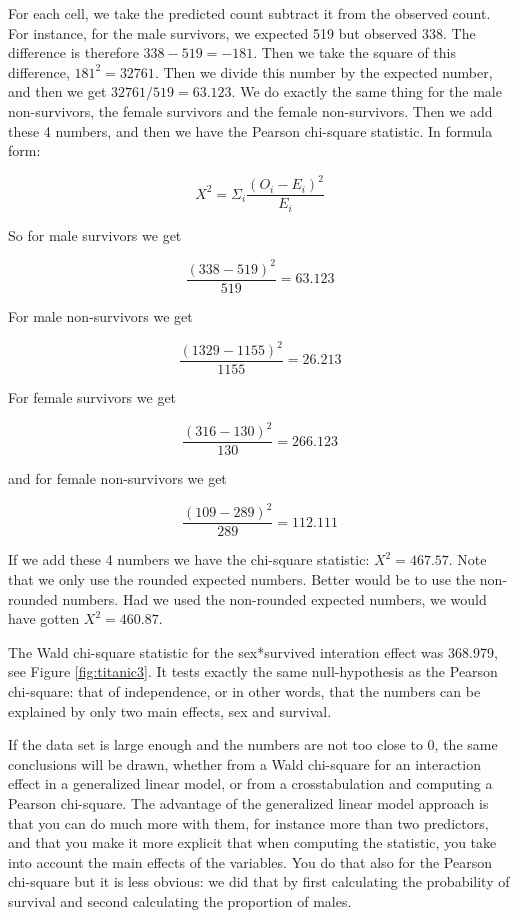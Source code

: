\documentclass[]{report}\usepackage[]{graphicx}\usepackage[]{color}
\begin{document}
For each cell, we take the predicted count subtract it from the observed count. For instance, for the male survivors, we expected 519 but observed 338. The difference is therefore $338-519= -181$. Then we take the square of this difference, $ 181^2=32761$. Then we divide this number by the expected number, and then we get $32761/519=63.123$. We do exactly the same thing for the male non-survivors, the female survivors and the female non-survivors. Then we add these 4 numbers, and then we have the Pearson chi-square statistic. In formula form:

\begin{equation}
X^2 = \Sigma_i    \frac{(O_i-E_i)^2}{E_i}
\end{equation}


So for male survivors we get


\begin{equation}
 \frac{(338-519)^2}{519} =63.123
\end{equation}




For male non-survivors we get


\begin{equation}
 \frac{(1329-1155)^2}{1155} =26.213
\end{equation}

For female survivors we get


\begin{equation}
 \frac{(316-130)^2}{130} =266.123
\end{equation}

and for female non-survivors we get

\begin{equation}
 \frac{(109-289)^2}{289} =112.111
\end{equation}




If we add these 4 numbers we have the chi-square statistic: $X^2= 467.57$. Note that we only use the rounded expected numbers. Better would be to use the non-rounded numbers. Had we used the non-rounded expected numbers, we would have gotten $X^2 = 460.87$.

The Wald chi-square statistic for the sex*survived interation effect was 368.979, see Figure \ref{fig:titanic3}. It tests exactly the same null-hypothesis as the Pearson chi-square: that of independence, or in other words, that the numbers can be explained by only two main effects, sex and survival.

If the data set is large enough and the numbers are not too close to 0, the same conclusions will be drawn, whether from a Wald chi-square for an interaction effect in a generalized linear model, or from a crosstabulation and computing a Pearson chi-square. The advantage of the generalized linear model approach is that you can do much more with them, for instance more than two predictors, and that you make it more explicit that when computing the statistic, you take into account the main effects of the variables. You do that also for the Pearson chi-square but it is less obvious: we did that by first calculating the probability of survival and second calculating the proportion of males.
\end{document}
